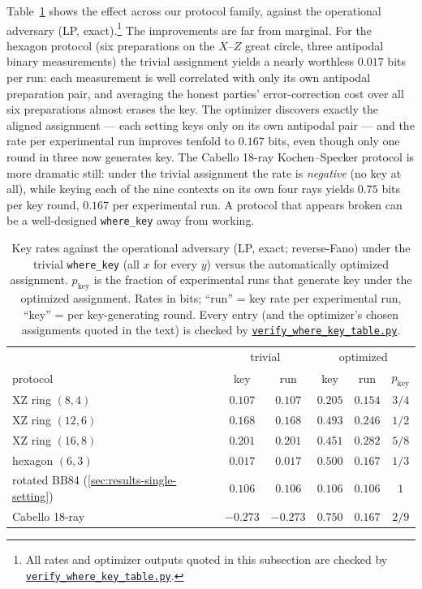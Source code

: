\documentclass[aps,pra,twocolumn,superscriptaddress,longbibliography,nofootinbib]{revtex4-2}
\newcommand{\wherekey}{\texttt{where\_key}}
\newcommand{\repoBase}{https://github.com/eliewolfe/RandomnessWinterSchool2026/blob/main/paper/scripts}
\newcommand{\repoScript}[1]{\href{\repoBase/#1}{\texttt{#1}}}
\begin{document}
Table~\ref{tab:wherekey} shows the effect across our protocol family,
against the operational adversary (LP, exact).\footnote{All rates and
optimizer outputs quoted in this subsection are checked by
\repoScript{verify\_where\_key\_table.py}.} The improvements are far
from marginal. For the hexagon protocol (six preparations on the
$X$--$Z$ great circle, three antipodal binary measurements) the trivial
assignment yields a nearly worthless $0.017$ bits per run: each
measurement is well correlated with only its own antipodal preparation
pair, and averaging the honest parties' error-correction cost over all
six preparations almost erases the key. The optimizer discovers exactly
the aligned assignment --- each setting keys only on its own antipodal
pair --- and the rate per experimental run improves tenfold to
$0.167$ bits, even though only one round in three now generates key.
The Cabello 18-ray Kochen--Specker protocol is more dramatic still:
under the trivial assignment the rate is \emph{negative} (no key at
all), while keying each of the nine contexts on its own four rays
yields $0.75$ bits per key round, $0.167$ per experimental run. A
protocol that appears broken can be a well-designed \wherekey{} away
from working.

\begin{table}
\caption{\label{tab:wherekey}Key rates against the operational
adversary (LP, exact; reverse-Fano) under the trivial \wherekey{}
(all $x$ for every $y$) versus the automatically optimized assignment.
$p_{\mathrm{key}}$ is the fraction of experimental runs that generate
key under the optimized assignment. Rates in bits; ``run'' = key rate
per experimental run, ``key'' = per key-generating round. Every entry
(and the optimizer's chosen assignments quoted in the text) is checked
by \repoScript{verify\_where\_key\_table.py}.}
\begin{ruledtabular}
\begin{tabular}{lccccc}
 & \multicolumn{2}{c}{trivial} & \multicolumn{3}{c}{optimized} \\
protocol & key & run & key & run & $p_{\mathrm{key}}$ \\
\colrule
XZ ring $(8,4)$    & $0.107$  & $0.107$  & $0.205$ & $0.154$ & $3/4$ \\
XZ ring $(12,6)$   & $0.168$  & $0.168$  & $0.493$ & $0.246$ & $1/2$ \\
XZ ring $(16,8)$   & $0.201$  & $0.201$  & $0.451$ & $0.282$ & $5/8$ \\
hexagon $(6,3)$    & $0.017$  & $0.017$  & $0.500$ & $0.167$ & $1/3$ \\
rotated BB84 (\ref{sec:results-single-setting}) & $0.106$ & $0.106$ & $0.106$ & $0.106$ & $1$ \\
Cabello 18-ray     & $-0.273$ & $-0.273$ & $0.750$ & $0.167$ & $2/9$ \\
\end{tabular}
\end{ruledtabular}
\end{table}
\end{document}
